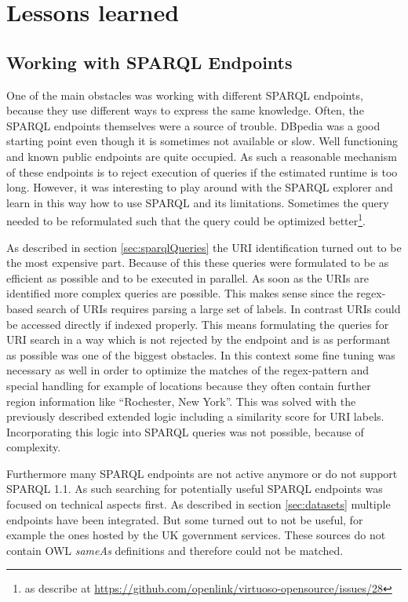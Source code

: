 \section{Lessons learned}
\subsection{Working with SPARQL Endpoints}
One of the main obstacles was working with different SPARQL endpoints, because they use different ways to express the same knowledge. Often, the SPARQL endpoints themselves were a source of trouble. DBpedia was a good starting point even though it is sometimes not available or slow. Well functioning and known public endpoints are quite occupied. As such a reasonable mechanism of these endpoints is to reject execution of queries if the estimated runtime is too long. However, it was interesting to play around with the SPARQL explorer and learn in this way how to use SPARQL and its limitations. Sometimes the query needed to be reformulated such that the query could be optimized better\footnote{as describe at \url{https://github.com/openlink/virtuoso-opensource/issues/28}}.

As described in section \ref{sec:sparqlQueries} the URI identification turned out to be the most expensive part. Because of this  these queries were formulated to be as efficient as possible and to be executed in parallel. As soon as the URIs are identified more complex queries are possible. This makes sense since the regex-based search of URIs requires parsing a large set of labels. In contrast URIs could be accessed directly if indexed properly. This means formulating the queries for URI search in a way which is not rejected by the endpoint and is as performant as possible was one of the biggest obstacles. In this context some fine tuning was necessary as well in order to optimize the matches of the regex-pattern and special handling for example of locations because they often contain further region information like ``Rochester, New York''. This was solved with the previously described extended logic including a similarity score for URI labels. Incorporating this logic into SPARQL queries was not possible, because of complexity. 

Furthermore many SPARQL endpoints are not active anymore or do not support SPARQL 1.1. As such searching for potentially useful SPARQL endpoints was focused on technical aspects first. As described in section \ref{sec:datasets} multiple endpoints have been integrated. But some turned out to not be useful, for example the ones hosted by the UK government services. These sources do not contain OWL \textit{sameAs} definitions and therefore could not be matched.

